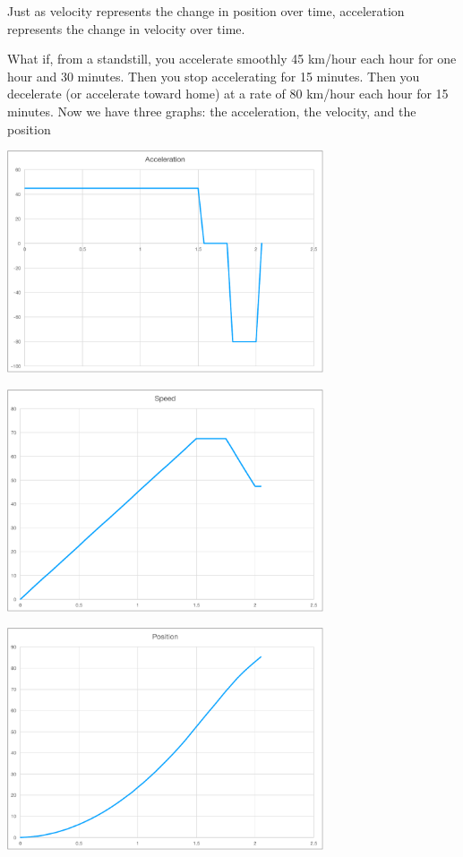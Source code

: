 Just as velocity represents the change in position over time,
acceleration represents the change in velocity over time.

What if, from a standstill, you accelerate smoothly 45 km/hour each
hour for one hour and 30 minutes. Then you stop accelerating for 15
minutes. Then you decelerate (or accelerate toward home) at a rate of
80 km/hour each hour for 15 minutes.  Now we have three graphs: the
acceleration, the velocity, and the position

\includegraphics[width=0.7\textwidth]{acceleration_asp.pdf}

\includegraphics[width=0.7\textwidth]{speed_asp.pdf}

\includegraphics[width=0.7\textwidth]{position_asp.pdf}


